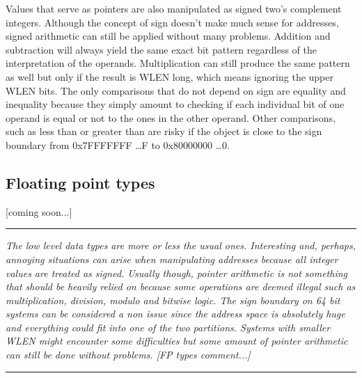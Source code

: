         Values that serve as pointers are also manipulated as signed two's complement integers. Although the concept of sign doesn't make much sense for addresses, signed arithmetic can still be applied without many problems. Addition and subtraction will always yield the same exact bit pattern regardless of the interpretation of the operands. Multiplication can still produce the same pattern as well but only if the result is WLEN long, which means ignoring the upper WLEN bits. The only comparisons that do not depend on sign are equality and inequality because they simply amount to checking if each individual bit of one operand is equal or not to the ones in the other operand. Other comparisons, such as less than or greater than are risky if the object is close to the sign boundary from 0x7FFFFFFF \ldots F to 0x80000000 \ldots 0.

    \subsection{Floating point types}

        [coming soon...]

    \par\noindent\rule{\textwidth}{0.4pt}
    \textit{The low level data types are more or less the usual ones. Interesting and, perhaps, annoying situations can arise when manipulating addresses because all integer values are treated as signed. Usually though, pointer arithmetic is not something that should be heavily relied on because some operations are deemed illegal such as multiplication, division, modulo and bitwise logic. The sign boundary on 64 bit systems can be considered a non issue since the address space is absolutely huge and everything could fit into one of the two partitions. Systems with smaller WLEN might encounter some difficulties but some amount of pointer arithmetic can still be done without problems. [FP types comment...]}
    \par\noindent\rule{\textwidth}{0.4pt}